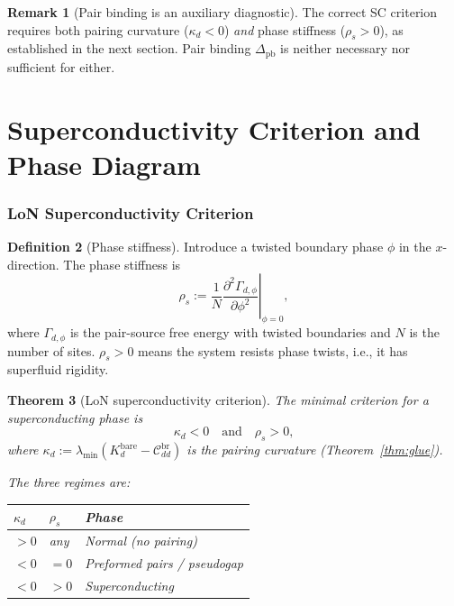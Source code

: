 \documentclass[12pt]{article}
\theoremstyle{plain}
\newtheorem{theorem}{Theorem}[section]
\theoremstyle{definition}
\newtheorem{definition}[theorem]{Definition}
\newtheorem{remark}[theorem]{Remark}
\numberwithin{equation}{section}
\newcommand{\br}{\mathrm{br}}
\begin{document}
\begin{remark}[Pair binding is an auxiliary diagnostic]
The correct SC criterion requires both pairing curvature
($\kappa_d<0$) \emph{and} phase stiffness ($\rho_s>0$), as
established in the next section.  Pair binding $\Delta_{\mathrm{pb}}$
is neither necessary nor sufficient for either.
\end{remark}


\part{Superconductivity Criterion and Phase Diagram}

\section{LoN Superconductivity Criterion}\label{sec:SCcriterion}

\begin{definition}[Phase stiffness]\label{def:stiffness}
Introduce a twisted boundary phase $\phi$ in the $x$-direction.
The phase stiffness is
\begin{equation}\label{eq:rhos}
\boxed{\rho_s := \frac{1}{N}\left.\frac{\partial^2\Gamma_{d,\phi}}
{\partial\phi^2}\right|_{\phi=0},}
\end{equation}
where $\Gamma_{d,\phi}$ is the pair-source free energy with
twisted boundaries and $N$ is the number of sites.
$\rho_s>0$ means the system resists phase twists, i.e., it has
superfluid rigidity.
\end{definition}

\begin{theorem}[LoN superconductivity criterion]\label{thm:SCcriterion}
The minimal criterion for a superconducting phase is
\begin{equation}\label{eq:SCcrit}
\boxed{\kappa_d < 0 \quad\text{and}\quad \rho_s > 0,}
\end{equation}
where $\kappa_d:=\lambda_{\min}(K_d^{\mathrm{bare}}-\mathcal{C}_{dd}^{\br})$
is the pairing curvature (Theorem~\ref{thm:glue}).

The three regimes are:
\begin{center}
\begin{tabular}{lll}
\toprule
$\kappa_d$ & $\rho_s$ & Phase\\
\midrule
$>0$ & any & Normal (no pairing)\\
$<0$ & $=0$ & Preformed pairs / pseudogap\\
$<0$ & $>0$ & Superconducting\\
\bottomrule
\end{tabular}
\end{center}
\end{theorem}
\end{document}
